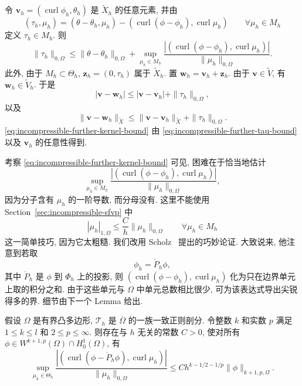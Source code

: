 \begin{Proof}
令 $\mathbf v_h=(\operatorname{curl}\phi_h,\theta_h)$
是 $\widetilde X_h$ 的任意元素, 并由
\[
(\tau_h,\mu_h)
=(\theta-\theta_h,\mu_h)
-(\operatorname{curl}(\phi-\phi_h),\operatorname{curl}\mu_h)
\qquad\forall\mu_h\in M_h
\]
定义 $\tau_h\in M_h$. 则
\begin{equation}\label{eq:incompressible-further-tau-bound}
\|\tau_h\|_{0,\Omega}
\leq\|\theta-\theta_h\|_{0,\Omega}
+\sup_{\mu_h\in M_h}
\frac{|(\operatorname{curl}(\phi-\phi_h),
\operatorname{curl}\mu_h)|}{\|\mu_h\|_{0,\Omega}}.
\end{equation}
此外, 由于 $M_h\subset\Theta_h$,
$\mathbf z_h=(0,\tau_h)$ 属于 $\widetilde X_h$.
置 $\mathbf w_h=\mathbf v_h+\mathbf z_h$.
由于 $\mathbf v\in\widetilde V$, 有 $\mathbf w_h\in\widetilde V_h$.
于是
\[
|\mathbf v-\mathbf w_h|
\leq|\mathbf v-\mathbf v_h|+\|\tau_h\|_{0,\Omega},
\]
以及
\[
\|\mathbf v-\mathbf w_h\|_{\widetilde X}
\leq\|\mathbf v-\mathbf v_h\|_{\widetilde X}
+\|\tau_h\|_{0,\Omega}.
\]
\eqref{eq:incompressible-further-kernel-bound}
由 \eqref{eq:incompressible-further-tau-bound}
以及 $\mathbf v_h$ 的任意性得到.
\end{Proof}

考察 \eqref{eq:incompressible-further-kernel-bound} 可见,
困难在于恰当地估计
\[
\sup_{\mu_h\in M_h}
\frac{|(\operatorname{curl}(\phi-\phi_h),
\operatorname{curl}\mu_h)|}{\|\mu_h\|_{0,\Omega}},
\]
因为分子含有 $\mu_h$ 的一阶导数, 而分母没有.
这里不能使用 Section~\ref{sec:incompressible-sfvp} 中
\[
|\mu_h|_{1,\Omega}
\leq\frac Ch\|\mu_h\|_{0,\Omega}
\qquad\forall\mu_h\in M_h
\]
这一简单技巧, 因为它太粗糙.
我们改用 Scholz~\cite{ref:scholz-72} 提出的巧妙论证.
大致说来, 他注意到若取
\[
\phi_h=\mathring P_h\phi,
\]
其中 $\mathring P_h$ 是 $\phi$ 到 $\Phi_h$ 上的投影,
则 $(\operatorname{curl}(\phi-\phi_h),\operatorname{curl}\mu_h)$
化为只在边界单元上取的积分之和.
由于这些单元与 $\Omega$ 中单元总数相比很少,
可为该表达式导出尖锐得多的界. 细节由下一个 Lemma 给出.

\begin{Lemma}\label{lem:incompressible-further-boundary-element-bound}
假设 $\Omega$ 是有界凸多边形,
$\mathcal T_h$ 是 $\overline\Omega$ 的一族一致正则剖分.
令整数 $k$ 和实数 $p$ 满足 $1\leq k\leq l$ 和 $2\leq p\leq\infty$.
则存在与 $h$ 无关的常数 $C>0$, 使对所有
$\phi\in W^{k+1,p}(\Omega)\cap H_0^1(\Omega)$, 有
\begin{equation}\label{eq:incompressible-further-boundary-element-bound}
\sup_{\mu_h\in\Theta_h}
\frac{|(\operatorname{curl}(\phi-\mathring P_h\phi),
\operatorname{curl}\mu_h)|}{\|\mu_h\|_{0,\Omega}}
\leq Ch^{k-1/2-1/p}\|\phi\|_{k+1,p,\Omega}.
\end{equation}
\end{Lemma}

